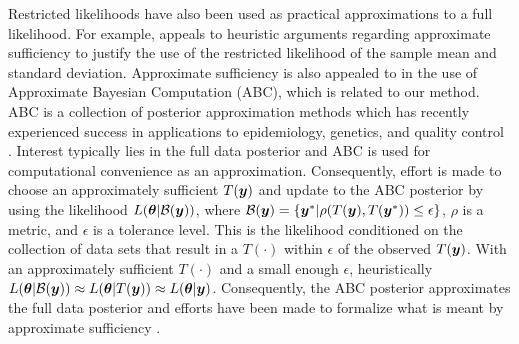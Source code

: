 \documentclass[ba]{imsart}
\def\bth{\mbox{\boldmath $\theta$}}
\newcommand{\by}{\mbox{\boldmath $y$}}
\begin{document}
Restricted likelihoods have also been used as practical approximations to a full likelihood. For example, \cite{pratt1965} appeals to heuristic arguments regarding approximate sufficiency to justify the use of the restricted likelihood of the sample mean and standard deviation. Approximate sufficiency is also appealed to in the use of Approximate Bayesian Computation (ABC), which is related to our method.  
ABC is a collection of posterior approximation methods which has recently experienced success in applications to epidemiology, genetics, and quality control \citep[see, for example,][]{tavare1997, pritchard1999, beaumont2002, marjoram2003, fearnhead2012, drovandi2015}. Interest typically lies in the full data posterior and ABC is used for computational convenience as an approximation.  Consequently, effort is made to choose an approximately sufficient $T(\by)$ and update to the ABC posterior by using the likelihood $L(\bth| \mathcal{B}(\by))$, where $\mathcal{B}(\by)=\{\by^{*}|\rho(T(\by),T(\by^{*})) \leq \epsilon\}$, $\rho$ is a metric, and $\epsilon$ is a tolerance level. This is the likelihood conditioned on the collection of data sets that result in a $T(\cdot)$ within $\epsilon$ of the observed $T(\by)$. %
With an approximately sufficient $T(\cdot)$ and a small enough $\epsilon$, heuristically  $L(\bth|\mathcal{B}(\by))\approx L(\bth|T(\by))\approx L(\bth|\by)$. Consequently, the ABC posterior approximates the full data posterior and efforts have been made to formalize what is meant by approximate sufficiency \citep[e.g.,][]{joyce2008}. 
\end{document}

